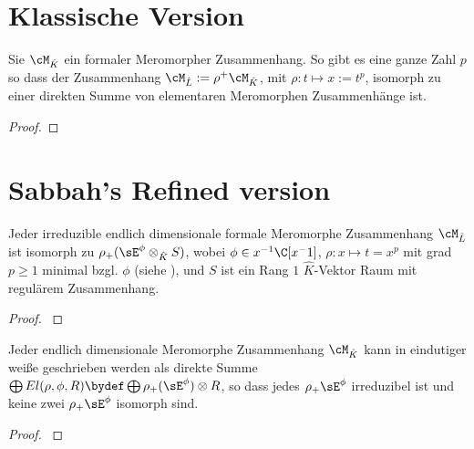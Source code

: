\section{Klassische Version}
\begin{thm}
\cite[Thm 5.4.7]{sabbah_cimpa90}
Sie $\cM_{\hat K}$ ein formaler Meromorpher Zusammenhang. So gibt es eine
ganze Zahl $p$ so dass der Zusammenhang $\cM_{\hat L}:=\rho^+\cM_{\hat K}$,
mit $\rho:t\mapsto x:=t^p$, isomorph zu einer direkten Summe von elementaren
Meromorphen Zusammenhänge
ist.
\end{thm}
\begin{proof}

\end{proof}

\section{Sabbah's Refined version}
\begin{prop}
\cite[Prop 3.1]{sabbah_Fourier-local}
Jeder irreduzible endlich dimensionale formale Meromorphe Zusammenhang
$\cM_{\hat L}$ ist isomorph zu $\rho_+(\sE^\phi\otimes_{\hat K} S)$, wobei
$\phi\in x^{-1}\C[x^-1]$, $\rho:x\mapsto t=x^p$ mit grad $p\geq1$ minimal bzgl.
$\phi$ (siehe \cite[Rem 2.8]{sabbah_Fourier-local}), und $S$ ist ein Rang $1$
$\hat K$-Vektor Raum mit regulärem Zusammenhang.
\end{prop}
\begin{proof}
\cite[Prop 3.1]{sabbah_Fourier-local}
\end{proof}

\begin{thm}
\cite[Cor 3.3]{sabbah_Fourier-local}
Jeder endlich dimensionale Meromorphe Zusammenhang $\cM_{\hat K}$ kann in
eindutiger weiße geschrieben werden als direkte Summe $\bigoplus
El(\rho,\phi,R)\bydef\bigoplus\rho_+(\sE^\phi)\otimes R$, so dass
jedes $\rho_+\sE^\phi$ irreduzibel ist und keine zwei $\rho_+\sE^\phi$ isomorph
sind.
\end{thm}
\begin{comment}
In welchem Raum ist $\cM$ ?? in $L$ oder in $K$
\end{comment}
\begin{proof}
\cite[Cor 3.3]{sabbah_Fourier-local}
\end{proof}


